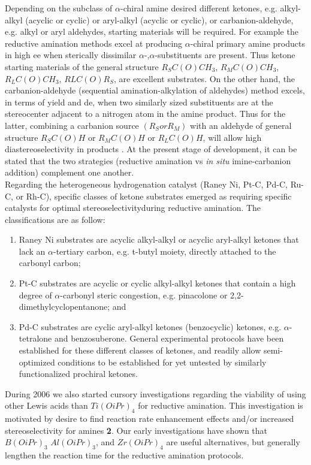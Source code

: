 Depending on the subclass of $\alpha$-chiral amine desired different ketones,
e.g. alkyl-alkyl (acyclic or cyclic) or aryl-alkyl (acyclic or cyclic), or
carbanion-aldehyde, e.g. alkyl or aryl aldehydes, starting materials will be required. For
example the reductive amination methods excel at producing $\alpha$-chiral primary amine
products in high ee when sterically dissimilar $\alpha$-,$\alpha$-substituents are
present. Thus ketone starting materials of the general structure $R_{S}C(O)CH_3$,
$R_{M}C(O)CH_3$, $R_{L}C(O)CH_3$, $RLC(O)R_S$, are excellent substrates. On the other
hand, the carbanion-aldehyde (sequential amination-alkylation of aldehydes) method excels,
in terms of yield and de, when two similarly sized substituents are at the stereocenter
adjacent to a nitrogen atom in the amine product. Thus for the latter, combining a
carbanion source $(R_S or R_M)$ with an aldehyde of general structure $R_{S}C(O)H$ or
$R_{M}C(O)H$ or $R_{L}C(O)H$, will allow high diastereoselectivity in products%
. At the present stage of development, it can be stated that the two strategies (reductive
amination vs \emph{in situ} imine-carbanion addition) complement one another.
\\
Regarding the heterogeneous hydrogenation catalyst (Raney Ni, Pt-C, Pd-C, Ru-C, or Rh-C),
specific classes of ketone substrates emerged as requiring specific catalysts for optimal
stereoselectivityduring reductive amination. The classifications are as follow:
\begin{enumerate}
\item Raney Ni substrates are acyclic alkyl-alkyl or acyclic aryl-alkyl ketones that lack
  an $\alpha$-tertiary carbon, e.g. t-butyl moiety, directly attached to the carbonyl
  carbon;
\item Pt-C substrates are acyclic or cyclic alkyl-alkyl ketones that contain a high degree
  of $\alpha$-carbonyl steric congestion, e.g. pinacolone or 2,2-dimethylcyclopentanone;
  and
\item Pd-C substrates are cyclic aryl-alkyl ketones (benzocyclic) ketones,
  e.g. $\alpha$-tetralone and benzosuberone. General experimental protocols have been
  established for these different classes of ketones, and readily allow semi-optimized
  conditions to be established for yet untested by similarly functionalized prochiral
  ketones.
\end{enumerate}

During 2006 we also started cursory investigations regarding the viability of using other
Lewis acids than $Ti(OiPr)_4$ for reductive amination. This investigation is motivated by
desire to find reaction rate enhancement effects and/or increased stereoselectivity for
amines \textbf{2}. Our early investigations have shown that $B(OiPr)_3$ $Al(OiPr)_3$, and
$Zr(OiPr)_4$ are useful alternatives, but generally lengthen the reaction time for the
reductive amination protocols.

